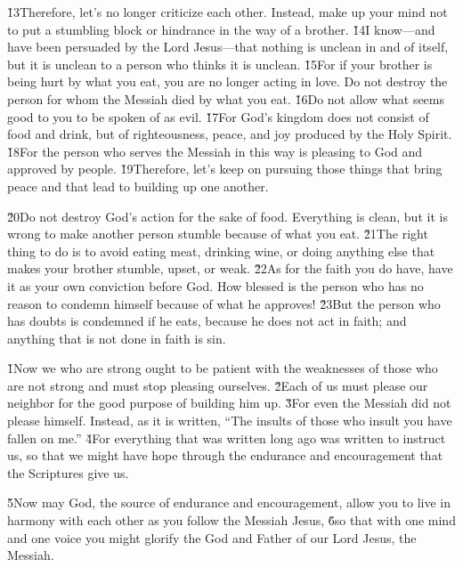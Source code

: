 \v{13}Therefore, let's no longer criticize each other. Instead, make up your mind not to put a stumbling block or hindrance in the way of a brother. \v{14}I know---and have been persuaded by the Lord Jesus---that nothing is unclean in and of itself, but it is unclean to a person who thinks it is unclean. \v{15}For if your brother is being hurt by what you eat, you are no longer acting in love. Do not destroy the person for whom the Messiah died by what you eat. \v{16}Do not allow what seems good to you to be spoken of as evil. \v{17}For God's kingdom does not consist of food and drink, but of righteousness, peace, and joy produced by the Holy Spirit. \v{18}For the person who serves the Messiah in this way is pleasing to God and approved by people. \v{19}Therefore, let's keep on pursuing those things that bring peace and that lead to building up one another.

\v{20}Do not destroy God's action for the sake of food. Everything is clean, but it is wrong to make another person stumble because of what you eat. \v{21}The right thing to do is to avoid eating meat, drinking wine, or doing anything else that makes your brother stumble, upset, or weak. \v{22}As for the faith you do have, have it as your own conviction before God. How blessed is the person who has no reason to condemn himself because of what he approves! \v{23}But the person who has doubts is condemned if he eats, because he does not act in faith; and anything that is not done in faith is sin.

\v{1}Now we who are strong ought to be patient with the weaknesses of those who are not strong and must stop pleasing ourselves. \v{2}Each of us must please our neighbor for the good purpose of building him up. \v{3}For even the Messiah did not please himself. Instead, as it is written, ``The insults of those who insult you have fallen on me.'' \v{4}For everything that was written long ago was written to instruct us, so that we might have hope through the endurance and encouragement that the Scriptures give us.

\v{5}Now may God, the source of endurance and encouragement, allow you to live in harmony with each other as you follow the Messiah Jesus, \v{6}so that with one mind and one voice you might glorify the God and Father of our Lord Jesus, the Messiah.

